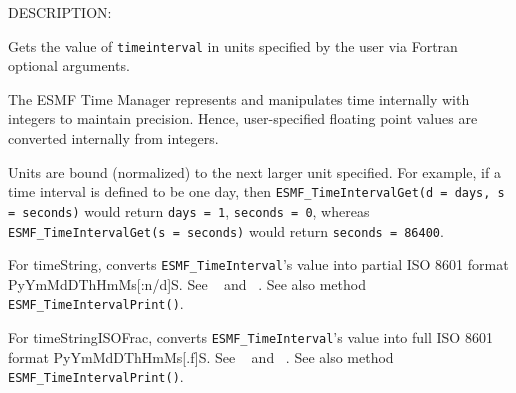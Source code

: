 {\sf DESCRIPTION:\\ }


       Gets the value of {\tt timeinterval} in units specified by the
       user via Fortran optional arguments.
  
       The ESMF Time Manager represents and manipulates time internally with
       integers to maintain precision.  Hence, user-specified floating point
       values are converted internally from integers.
  
       Units are bound (normalized) to the next larger unit specified.  For
       example, if a time interval is defined to be one day, then
       {\tt ESMF\_TimeIntervalGet(d = days, s = seconds)} would return
         {\tt days = 1}, {\tt seconds = 0},
       whereas {\tt ESMF\_TimeIntervalGet(s = seconds)} would return
         {\tt seconds = 86400}.
  
       For timeString, converts {\tt ESMF\_TimeInterval}'s value into
       partial ISO 8601 format PyYmMdDThHmMs[:n/d]S.  See ~\cite{ISO} and
       ~\cite{ISOnotes}.  See also method {\tt ESMF\_TimeIntervalPrint()}.
  
       For timeStringISOFrac, converts {\tt ESMF\_TimeInterval}'s value into
       full ISO 8601 format PyYmMdDThHmMs[.f]S.  See ~\cite{ISO} and
       ~\cite{ISOnotes}.  See also method {\tt ESMF\_TimeIntervalPrint()}.
  
